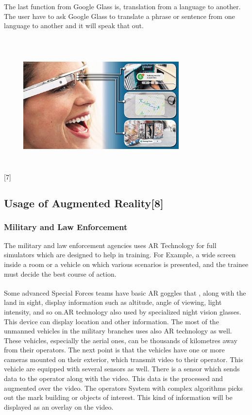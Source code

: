 \\
\\
The last function from  Google Glass is, translation from a language to another. The user have to ask Google Glass to translate a phrase or sentence from one language to another and it will speak that out.
\\
\\
\begin{figure}[H]
\centering
\includegraphics[width=240pt,height=180pt,keepaspectratio]{graphics/googlefunctions.png}
\caption{\cite{javaObjectClass}}
\end{figure}
[7]
\subsection{Usage of Augmented Reality[8]}
\subsubsection{Military and Law Enforcement }
The military and law enforcement agencies uses  AR Technology for  full simulators which are designed to help in training.  For Example, a wide screen inside a room or a vehicle on which various scenarios is presented, and the trainee must decide the best course of action.
\\
\\
Some advanced Special Forces teams have basic AR goggles that , along with the land in sight, display information such as altitude, angle of viewing, light intensity, and so on.AR technology also used by specialized night vision glasses. This device can display location and other information. The most of the unmanned vehicles in the military branches uses also AR technology as well. These vehicles, especially the aerial ones, can be thousands of kilometres away from their operators. The next point is that the vehicles have one or more cameras mounted on their exterior, which transmit video to their operator. This vehicle are equipped with several sensors as well. There is a sensor which sends data to the operator along with the video. This data is the processed and augmented over the video.  The operators System with complex algorithms picks out the mark building or objects of interest. This kind of information will be displayed as an overlay on the video.
\\
\\
